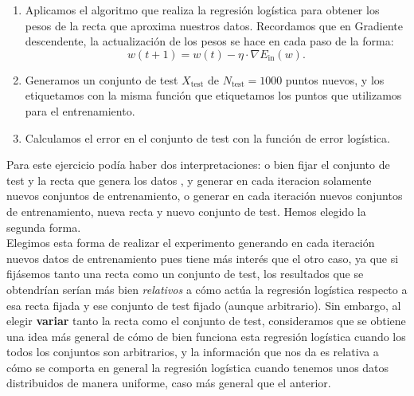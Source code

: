 \documentclass[12pt]{article}
\begin{document}
{\begin{enumerate}
\begin{lstlisting}[language=Python]
  # Generate data and line
  a,b = generate_line([0,2])
  X = generate_uniform_data(N_train,2,[0,2])
  # Create tags using the line
  y = np.array([f(x[0],x[1],a,b) for x in X])
  X = np.hstack((np.ones((X.shape[0], 1)), X))
\end{lstlisting}

\item Aplicamos el algoritmo  que realiza la regresión logística para obtener los pesos de la recta que aproxima nuestros datos. Recordamos que en Gradiente descendente, la actualización de los pesos se hace en cada paso de la forma:
$$
w(t+1) = w(t) - \eta \cdot \nabla E_{\operatorname{in}}(w).
$$

\item Generamos un conjunto de test $X_{\operatorname{test}}$ de $N_{\operatorname{test}} = 1000$ puntos nuevos, y los etiquetamos con la misma función que etiquetamos los puntos que utilizamos para el entrenamiento.

\item Calculamos el error en el conjunto de test con la función de error logística. 

\end{enumerate}

Para este ejercicio podía haber dos interpretaciones: o bien fijar el conjunto de test y la recta que genera los datos , y generar en cada iteracion solamente nuevos conjuntos de entrenamiento, o generar en cada iteración nuevos conjuntos de entrenamiento, nueva recta y nuevo conjunto de test. Hemos elegido la segunda forma.\\

Elegimos esta forma de realizar el experimento generando en cada iteración nuevos datos de entrenamiento pues tiene más interés que el otro caso, ya que si fijásemos tanto una recta como un conjunto de test, los resultados que se obtendrían serían más bien \emph{relativos} a cómo actúa la regresión logística respecto a esa recta fijada y ese conjunto de test fijado (aunque arbitrario). Sin embargo, al elegir \textbf{variar} tanto la recta como el conjunto de test, consideramos que se obtiene una idea más general de cómo de bien funciona esta regresión logística cuando los todos los conjuntos son arbitrarios, y la información que nos da es relativa a cómo se comporta en general la regresión logística cuando tenemos unos datos distribuidos de manera uniforme, caso más general que el anterior.

}
\end{document}
